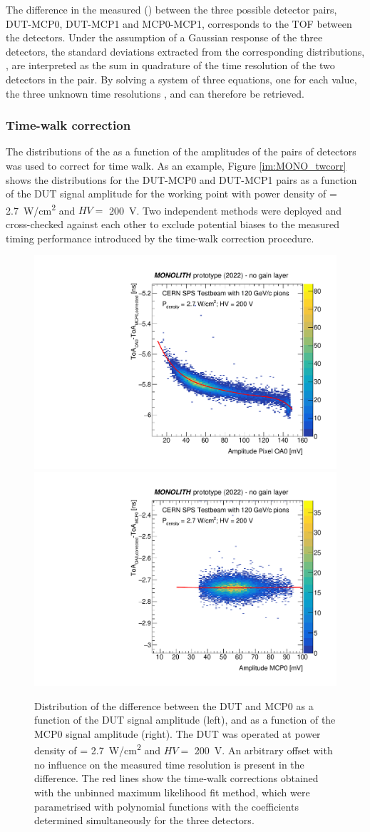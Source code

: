 		The difference in the measured \toa (\dtoa) between the three possible detector pairs, DUT-MCP0, DUT-MCP1 and MCP0-MCP1, corresponds to the TOF between the detectors. Under the assumption of a Gaussian response of the three detectors, the standard deviations extracted from the corresponding \dtoa distributions, \sigdtoa, are interpreted as the sum in quadrature of the time resolution of the two detectors in the pair. By solving a system of three equations, one for each \sigdtoa value, the three unknown time resolutions \sigdut, \sigmcpzero and \sigmcpone can therefore be retrieved.

		\subsubsection{Time-walk correction}
		The distributions of the \dtoa as a function of the amplitudes of the pairs of detectors was used to correct for time walk. As an example, Figure \ref{im:MONO_twcorr} shows the \dtoa distributions for the DUT-MCP0 and DUT-MCP1 pairs as a function of the DUT signal amplitude
		for the working point with power density of \power = \SI{2.7}{\watt/\centi\meter^2} and $HV =$ \SI{200}{\volt}. Two independent methods were deployed and cross-checked against each other to exclude potential biases to the measured timing performance introduced by the time-walk correction procedure. 
		\begin{figure}[!h]
			\centering
			\includegraphics[width=.49\textwidth,trim=0 0 0 0]{files/MONOLITH_paper/TOF_1_vsAmp_1.pdf}
			\includegraphics[width=.49\textwidth,trim=0 0 0 0]{files/MONOLITH_paper/TOF_1_vsAmp_2.pdf}
			\caption{\label{fig:twcorr} Distribution of the difference \dtoa between the DUT and MCP0 as a function of the DUT signal amplitude (left), and as a function of the MCP0 signal amplitude (right). The DUT was operated at power density of \power = \SI{2.7}{\watt/\centi\meter^2} and $ HV =$ \SI{200}{\volt}. An arbitrary offset with no influence on the measured time resolution is present in the \toa difference. The red lines show the time-walk corrections obtained with the unbinned maximum likelihood fit method, which were parametrised with polynomial functions with the coefficients determined simultaneously for the three detectors.}
		\end{figure}

